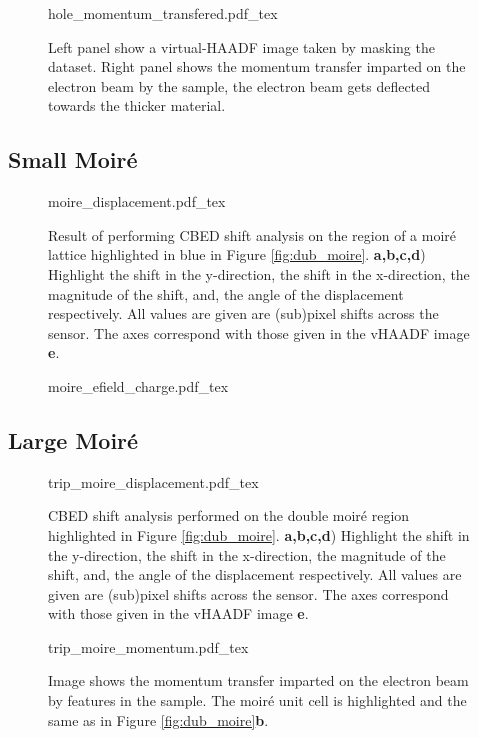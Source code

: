 \begin{figure}
    \centering
    \def\svgwidth{.7\linewidth}
    {hole_momentum_transfered.pdf_tex}
    \caption{Left panel show a virtual-HAADF image taken by masking the dataset. Right panel shows the momentum transfer imparted on the electron beam by the sample, the electron beam gets deflected towards the thicker material.}
    \label{fig:hole_mom}
\end{figure}

\subsection{Small Moiré}

\begin{figure}
    \centering
    \def\svgwidth{.95\linewidth}
    {moire_displacement.pdf_tex}
    \caption{Result of performing CBED shift analysis on the region of a moiré lattice highlighted in blue in Figure \ref{fig:dub_moire}. \textbf{a,b,c,d}) Highlight the shift in the y-direction, the shift in the x-direction, the magnitude of the shift, and, the angle of the displacement respectively. All values are given are (sub)pixel shifts across the sensor. The axes correspond with those given in the vHAADF image \textbf{e}.}
    \label{fig:m_dis}
\end{figure}


\begin{figure}
    \centering
    \def\svgwidth{.5\linewidth}
    {moire_efield_charge.pdf_tex}
    \caption{}
    \label{fig:m_mom}
\end{figure}

\subsection{Large Moiré}

\begin{figure}
    \centering
    \def\svgwidth{.95\linewidth}
    {trip_moire_displacement.pdf_tex}
    \caption{CBED shift analysis performed on the double moiré region highlighted in Figure \ref{fig:dub_moire}. \textbf{a,b,c,d}) Highlight the shift in the y-direction, the shift in the x-direction, the magnitude of the shift, and, the angle of the displacement respectively. All values are given are (sub)pixel shifts across the sensor. The axes correspond with those given in the vHAADF image \textbf{e}.}
    \label{fig:trip_m_dis}
\end{figure}

\begin{figure}
    \centering
    \def\svgwidth{.7\linewidth}
    {trip_moire_momentum.pdf_tex}
    \caption{Image shows the momentum transfer imparted on the electron beam by features in the sample. The moiré unit cell is highlighted and the same as in Figure \ref{fig:dub_moire}\textbf{b}.}
    \label{fig:trip_m_mom}
\end{figure}

